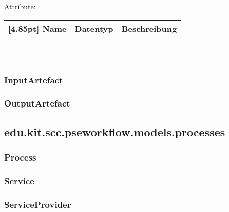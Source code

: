     	Attribute:
		\begin{center}
        	\renewcommand{\arraystretch}{1.5}
            \setlength\tabcolsep{5pt}
        	\begin{tabularx}{\textwidth}{|l|l|X|}
        		\hline
                \rowcolor[gray]{0.75}[4.85pt]            		
        	    Name & Datentyp & Beschreibung \\ \hline
        	    & & \\ \hline
        	    & & \\ \hline
        	    & & \\ \hline
        	    & & \\ \hline
        	    & & \\ \hline
        	    & & \\ \hline
        	    & & \\ \hline
        	    & & \\ \hline
        	\end{tabularx}
        \end{center}
    	
    	\subsubsection{InputArtefact}
    	
    	\subsubsection{OutputArtefact}

    \subsection{edu.kit.scc.pseworkflow.models.processes}
    
        \subsubsection{Process}
        
        
        
        \subsubsection{Service}
        
        \subsubsection{ServiceProvider}
        
